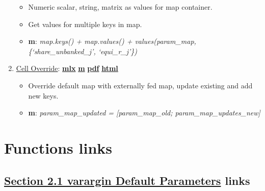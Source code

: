 \documentclass[
]{book}
\providecommand{\tightlist}{%
  \setlength{\itemsep}{0pt}\setlength{\parskip}{0pt}}
\begin{document}
\begin{enumerate}
  \begin{itemize}
  \tightlist
  \item
    Numeric scalar, string, matrix as values for map container.
  \item
    Get values for multiple keys in map.
  \item
    \textbf{m}: \emph{map.keys() + map.values() + values(param\_map, \{`share\_unbanked\_j', `equi\_r\_j'\})}
  \end{itemize}
\item
  \href{https://fanwangecon.github.io/M4Econ/amto/container/htmlpdfm/fs_map_override.html}{Cell Override}: \href{https://github.com/FanWangEcon/M4Econ/blob/master/amto/container/fs_map_override.mlx}{\textbf{mlx}} \textbar{} \href{https://github.com/FanWangEcon/M4Econ/blob/master/amto/container/htmlpdfm/fs_map_override.m}{\textbf{m}} \textbar{} \href{https://github.com/FanWangEcon/M4Econ/blob/master/amto/container/htmlpdfm/fs_map_override.pdf}{\textbf{pdf}} \textbar{} \href{https://fanwangecon.github.io/M4Econ/amto/container/htmlpdfm/fs_map_override.html}{\textbf{html}}

  \begin{itemize}
  \tightlist
  \item
    Override default map with externally fed map, update existing and add new keys.
  \item
    \textbf{m}: \emph{param\_map\_updated = {[}param\_map\_old; param\_map\_updates\_new{]}}
  \end{itemize}
\end{enumerate}

\hypertarget{functions-links}{%
\section{Functions links}\label{functions-links}}

\hypertarget{section-2.1-varargin-default-parametersvarargin-default-parameters-links}{%
\subsection{\texorpdfstring{\protect\hyperlink{varargin-default-parameters}{Section 2.1 varargin Default Parameters} links}{Section 2.1 varargin Default Parameters links}}\label{section-2.1-varargin-default-parametersvarargin-default-parameters-links}}
\end{document}
